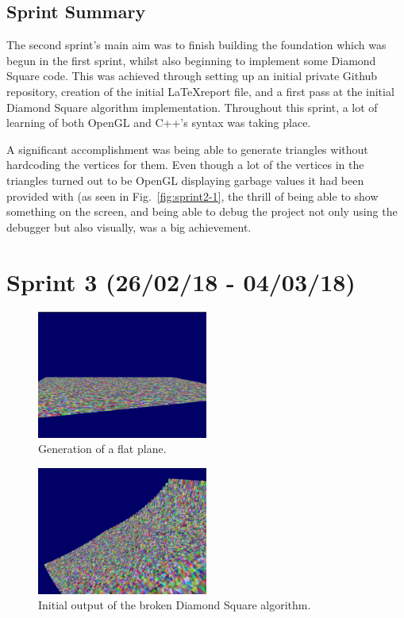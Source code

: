 \documentclass[a4paper,10pt]{report}
\begin{document}
\subsection{Sprint Summary}

The second sprint's main aim was to finish building the foundation which was begun in the first sprint, whilst also beginning to implement some Diamond Square code. This was achieved through setting up an initial private Github repository, creation of the initial \LaTeX report file, and a first pass at the initial Diamond Square algorithm implementation. Throughout this sprint, a lot of learning of both OpenGL and C++'s syntax was taking place.  \medskip

A significant accomplishment was being able to generate triangles without hardcoding the vertices for them. Even though a lot of the vertices in the triangles turned out to be OpenGL displaying garbage values it had been provided with (as seen in Fig.~\ref{fig:sprint2-1}, the thrill of being able to show something on the screen, and being able to debug the project not only using the debugger but also visually, was a big achievement. 

\clearpage

\section{Sprint 3 (26/02/18 - 04/03/18)}


\begin{figure}[h!]
    \centering
  \includegraphics[width=0.5\textwidth]{Images/Sprint-Images/Sprint3-2.png}
 \caption{Generation of a flat plane.}
  \label{fig:sprint3-2}
\end{figure}

\begin{figure}[h!]
    \centering
  \includegraphics[width=0.5\textwidth]{Images/Sprint-Images/Sprint3-3.png}
 \caption{Initial output of the broken Diamond Square algorithm.}
  \label{fig:sprint3-3}
\end{figure}
\end{document}
